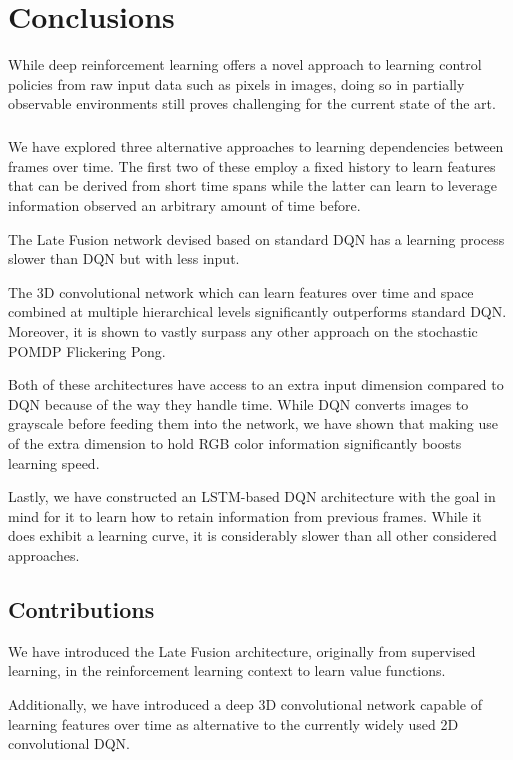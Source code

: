 \chapter{Conclusions}
While deep reinforcement learning offers a novel approach
to learning control policies
from raw input data such as pixels in images,
doing so in partially observable environments
still proves challenging for the current state of the art.

\paragraph{}
We have explored three alternative approaches
to learning dependencies between frames over time.
The first two of these employ a fixed history
to learn features that can be derived from short time spans
while the latter can learn to leverage information
observed an arbitrary amount of time before.

The Late Fusion network devised based on standard DQN
has a learning process slower than DQN
but with less input.

The 3D convolutional network which can
learn features over time and space combined
at multiple hierarchical levels
significantly outperforms standard DQN.
Moreover,
it is shown to vastly surpass any other approach
on the stochastic POMDP
Flickering Pong.

Both of these architectures have access to an extra input dimension
compared to DQN because of the way they handle time.
While DQN converts images to grayscale before feeding them
into the network,
we have shown that making use of the extra dimension
to hold RGB color information
significantly boosts learning speed.

Lastly,
we have constructed an LSTM-based DQN architecture
with the goal in mind for it to learn how to retain
information from previous frames.
While it does exhibit a learning curve,
it is considerably slower than all other considered approaches.


\section{Contributions}
\label{sec:contributions}
We have introduced the Late Fusion architecture,
originally from supervised learning,
in the reinforcement learning context
to learn value functions.

Additionally,
we have introduced a deep 3D convolutional network
capable of learning features over time
as alternative to the currently widely used 2D convolutional DQN.

